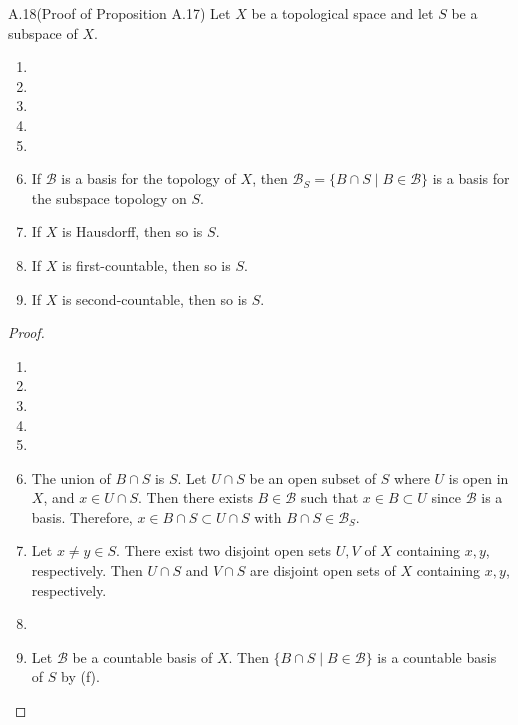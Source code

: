 \begin{customexer}{A.18(Proof of Proposition A.17)}\label{exercise_a_18}
  Let $X$ be a topological space and let $S$ be a subspace of $X$.
  \begin{enumerate}[label=(\alph*)]
    \item 
    \item 
    \item 
    \item 
    \item 
    \item 
      If $\mathcal{B}$ is a basis for the topology of $X$, then $\mathcal{B}_S = \{ B \cap S \mid B \in \mathcal{B} \}$ is a basis for the subspace topology on $S$.
    \item 
      If $X$ is Hausdorff, then so is $S$.
    \item 
      If $X$ is first-countable, then so is $S$.
    \item 
      If $X$ is second-countable, then so is $S$.
  \end{enumerate}
\end{customexer}

\begin{proof}
  $ $
  \begin{enumerate}[label=(\alph*)]
    \item 
    \item 
    \item 
    \item 
    \item 
    \item 
      The union of $B \cap S$ is $S$.
      Let $U \cap S$ be an open subset of $S$ where $U$ is open in $X$, and $x \in U \cap S$.
      Then there exists $B \in \mathcal{B}$ such that $x \in B \subset U$ since $\mathcal{B}$ is a basis.
      Therefore, $x \in B \cap S \subset U \cap S$ with $B \cap S \in \mathcal{B}_S$.
    \item 
      Let $x \ne y \in S$.
      There exist two disjoint open sets $U, V$ of $X$ containing $x, y$, respectively.
      Then $U \cap S$ and $V \cap S$ are disjoint open sets of $X$ containing $x, y$, respectively.
    \item 
    \item 
      Let $\mathcal{B}$ be a countable basis of $X$.
      Then $\{ B \cap S \mid B \in \mathcal{B} \}$ is a countable basis of $S$ by (f).
  \end{enumerate}
\end{proof}

